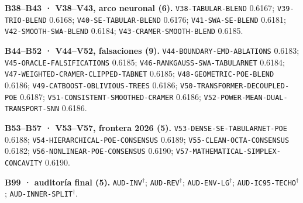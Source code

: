 \documentclass[journal]{IEEEtai}
\begin{document}
\par\medskip\noindent\textbf{B38--B43 · V38--V43, arco neuronal (6).} \texttt{V38-TABULAR-BLEND} 0.6167; \texttt{V39-TRIO-BLEND} 0.6168; \texttt{V40-SE-TABULAR-BLEND} 0.6176; \texttt{V41-SWA-SE-BLEND} 0.6181; \texttt{V42-SMOOTH-SWA-BLEND} 0.6184; \texttt{V43-CRAMER-SMOOTH-BLEND} 0.6185.

\par\medskip\noindent\textbf{B44--B52 · V44--V52, falsaciones (9).} \texttt{V44-BOUNDARY-EMD-ABLATIONS} 0.6183; \texttt{V45-ORACLE-FALSIFICATIONS} 0.6185; \texttt{V46-RANKGAUSS-SWA-TABULARNET} 0.6184; \texttt{V47-WEIGHTED-CRAMER-CLIPPED-TABNET} 0.6185; \texttt{V48-GEOMETRIC-POE-BLEND} 0.6186; \texttt{V49-CATBOOST-OBLIVIOUS-TREES} 0.6186; \texttt{V50-TRANSFORMER-DECOUPLED-POE} 0.6187; \texttt{V51-CONSISTENT-SMOOTHED-CRAMER} 0.6186; \texttt{V52-POWER-MEAN-DUAL-TRANSPORT-SNN} 0.6186.

\par\medskip\noindent\textbf{B53--B57 · V53--V57, frontera 2026 (5).} \texttt{V53-DENSE-SE-TABULARNET-POE} 0.6188; \texttt{V54-HIERARCHICAL-POE-CONSENSUS} 0.6189; \texttt{V55-CLEAN-OCTA-CONSENSUS} 0.6182; \texttt{V56-NONLINEAR-POE-CONSENSUS} 0.6190; \texttt{V57-MATHEMATICAL-SIMPLEX-CONCAVITY} 0.6190.

\par\medskip\noindent\textbf{B99 · auditor\'ia final (5).} \texttt{AUD-INV}$^{\dagger}$; \texttt{AUD-REV}$^{\dagger}$; \texttt{AUD-ENV-LG}$^{\dagger}$; \texttt{AUD-IC95-TECHO}$^{\dagger}$; \texttt{AUD-INNER-SPLIT}$^{\dagger}$.

\endgroup



\end{document}
